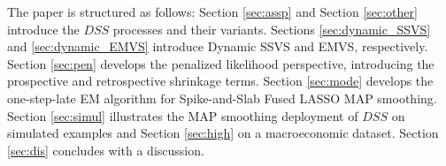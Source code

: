 \documentclass[ba]{imsart}
\numberwithin{equation}{section}
\theoremstyle{plain}
\begin{document}


 The paper is structured as follows: Section \ref{sec:assp} and Section \ref{sec:other} introduce the $DSS$ processes and their variants. 
 Sections \ref{sec:dynamic_SSVS} and \ref{sec:dynamic_EMVS} introduce Dynamic SSVS and EMVS, respectively. Section \ref{sec:pen} develops the penalized likelihood perspective, introducing the prospective and retrospective shrinkage terms. Section \ref{sec:mode} develops the one-step-late EM algorithm for Spike-and-Slab Fused LASSO MAP smoothing. Section \ref{sec:simul} illustrates the MAP smoothing deployment of $DSS$ on simulated examples and Section \ref{sec:high}  on a macroeconomic dataset. Section \ref{sec:dis} concludes with a discussion.
 

\end{document}
